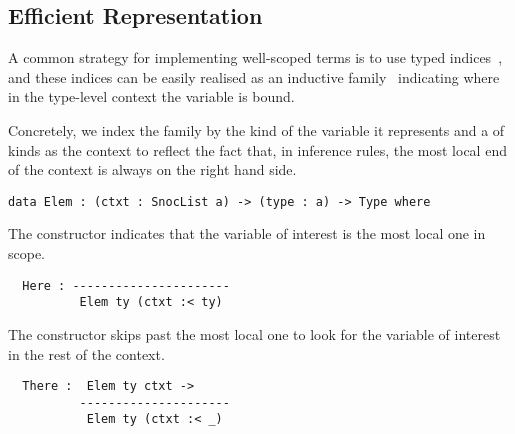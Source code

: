 \subsection{Efficient \DeBruijn{} Representation}
\label{sec:design:deBruijn}

A common strategy for implementing well-scoped terms is to use typed
\emph{\DeBruijn{}} indices~\cite{MANUAL:journals/math/debruijn72}, and these indices can be easily realised as an inductive family~\cite{DBLP:journals/fac/Dybjer94}
indicating where in the type-level context the variable is bound.

Concretely, we index the  family by the kind of the variable it represents and a  of kinds as the context to reflect the fact that,
in inference rules, the most local end of the context is always on the right hand side.

\begin{center}
  \begin{minipage}{0.10\textwidth}
    \varRule
  \end{minipage}\hfill
  \begin{minipage}{0.80\textwidth}
\begin{Verbatim}
data Elem : (ctxt : SnocList a) -> (type : a) -> Type where
\end{Verbatim}
  \end{minipage}
\end{center}

The  constructor indicates that the variable of interest is
the most local one in scope.
%

\begin{center}
  \begin{minipage}{0.35\textwidth}
    \varZero
  \end{minipage}\hfill
  \begin{minipage}{0.55\textwidth}
\begin{Verbatim}
  Here : ----------------------
          Elem ty (ctxt :< ty)
\end{Verbatim}
  \end{minipage}
\end{center}

The  constructor skips past the most local one to look for
the variable of interest in the rest of the context.

\begin{center}
  \begin{minipage}{0.35\textwidth}
    \varSuc
  \end{minipage}\hfill
  \begin{minipage}{0.55\textwidth}
\begin{Verbatim}
  There :  Elem ty ctxt ->
          ---------------------
           Elem ty (ctxt :< _)
\end{Verbatim}
  \end{minipage}
\end{center}


